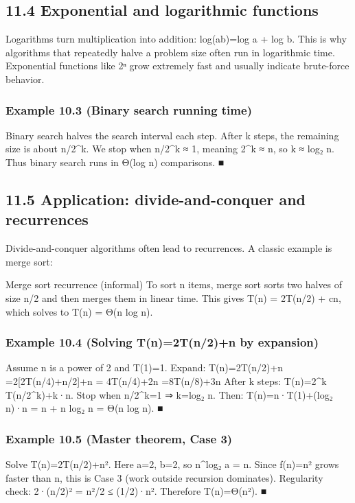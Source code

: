\documentclass[11pt]{article}
\begin{document}
\subsection{11.4 Exponential and logarithmic functions}
Logarithms turn multiplication into addition: log(ab)=log a + log b. This is why algorithms
that repeatedly halve a problem size often run in logarithmic time. Exponential functions
like 2ⁿ grow extremely fast and usually indicate brute-force behavior.
\subsubsection*{Example 10.3 (Binary search running time)}
Binary search halves the search interval each step. After k steps, the remaining
size is about n/2\textasciicircum{}k.
We stop when n/2\textasciicircum{}k ≈ 1, meaning 2\textasciicircum{}k ≈ n, so k ≈ log₂ n.
Thus binary search runs in Θ(log n) comparisons. ■
\subsection{11.5 Application: divide-and-conquer and recurrences}
Divide-and-conquer algorithms often lead to recurrences. A classic example is merge sort:

Merge sort recurrence (informal)
To sort n items, merge sort sorts two halves of size n/2 and then merges them in
linear time.
This gives T(n) = 2T(n/2) + cn, which solves to T(n) = Θ(n log n).
\subsubsection*{Example 10.4 (Solving T(n)=2T(n/2)+n by expansion)}
Assume n is a power of 2 and T(1)=1. Expand:
T(n)=2T(n/2)+n
=2[2T(n/4)+n/2]+n = 4T(n/4)+2n
=8T(n/8)+3n
After k steps: T(n)=2\textasciicircum{}k T(n/2\textasciicircum{}k)+k·n.
Stop when n/2\textasciicircum{}k=1 ⇒ k=log₂ n. Then:
T(n)=n·T(1)+(log₂ n)·n = n + n log₂ n = Θ(n log n). ■
\subsubsection*{Example 10.5 (Master theorem, Case 3)}
Solve T(n)=2T(n/2)+n².
Here a=2, b=2, so n\textasciicircum{}log₂ a = n. Since f(n)=n² grows faster than n,
this is Case 3 (work outside recursion dominates).
Regularity check: 2·(n/2)² = n²/2 ≤ (1/2)·n².
Therefore T(n)=Θ(n²). ■
\end{document}
